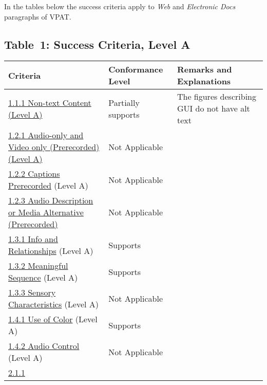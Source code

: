 \documentclass{report}
\begin{document}
In the tables below the success criteria apply to \emph{Web} and
\emph{Electronic Docs} paragraphs of VPAT.


\subsection{Table~1:  Success Criteria, Level A}
\begin{longtable}{p{}<{\RaggedRight}p{}<{\RaggedRight}p{}<{\RaggedRight}}
  \toprule
  Criteria & Conformance Level & Remarks and Explanations \\
  \midrule
  \endhead
  \bottomrule
  \endfoot
	\href{https://www.w3.org/TR/WCAG20/#text-equiv-all}{1.1.1
  Non-text Content (Level A)} & Partially supports & The figures
                                                     describing GUI do
                                                     not have alt
                                                     text\\
        \href{https://www.w3.org/TR/WCAG20/#media-equiv-av-only-alt}{1.2.1
  Audio-only and Video only (Prerecorded) (Level A)} & Not Applicable\\
  \href{https://www.w3.org/TR/WCAG20/#media-equiv-captions}{1.2.2
  Captions Prerecorded} (Level A) & Not Applicable\\
        \href{http://www.w3.org/TR/WCAG20/#media-equiv-audio-desc}{1.2.3
                                    Audio Description or Media
                                    Alternative (Prerecorded)}
                               & Not Applicable\\
        \href{http://www.w3.org/TR/WCAG20/#content-structure-separation-programmatic}{1.3.1
  Info and Relationships} (Level A) & Supports \\
    \href{http://www.w3.org/TR/WCAG20/#content-structure-separation-programmatic}{1.3.2
  Meaningful Sequence} (Level A) & Supports \\
  \href{http://www.w3.org/TR/WCAG20/#content-structure-separation-understanding}{1.3.3
  Sensory Characteristics} (Level A) & Not Applicable\\
  \href{http://www.w3.org/TR/WCAG20/#visual-audio-contrast-without-color}{1.4.1
  Use of Color} (Level A) & Supports \\
  \href{http://www.w3.org/TR/WCAG20/#visual-audio-contrast-dis-audio}{1.4.2
  Audio Control} (Level A) & Not Applicable\\
  \href{http://www.w3.org/TR/WCAG20/#keyboard-operation-keyboard-operable}{2.1.1
}
\end{longtable}
\end{document}
